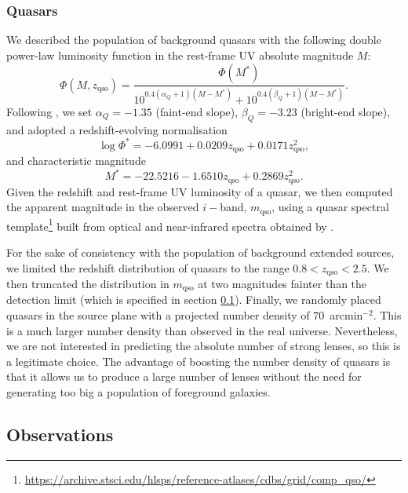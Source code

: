 \documentclass{aa}
\def\zqso{z_{\mathrm{qso}}}
\def\mqso{m_{\mathrm{qso}}}
\begin{document}
\subsubsection{Quasars}\label{ssub:quasars}

We described the population of background quasars with the following double power-law luminosity function in the rest-frame UV absolute magnitude $M$:
\begin{equation}
\Phi(M,\zqso) = \dfrac{\Phi(M^*)}{10^{0.4(\alpha_Q+1)(M - M^*)} + 10^{0.4(\beta_Q+1)(M - M^*)}}.
\end{equation}
Following \citet{Man++17}, we set $\alpha_Q=-1.35$ (faint-end slope), $\beta_Q=-3.23$ (bright-end slope), and adopted a redshift-evolving normalisation
\begin{equation}
\log{\Phi^*} = -6.0991 + 0.0209\zqso + 0.0171\zqso^2,
\end{equation}
and characteristic magnitude
\begin{equation}
M^* = -22.5216 - 1.6510\zqso + 0.2869\zqso^2.
\end{equation}
Given the redshift and rest-frame UV luminosity of a quasar, we then computed the apparent magnitude in the observed $i-$band, $\mqso$, using a quasar spectral template\footnote{\url{https://archive.stsci.edu/hlsps/reference-atlases/cdbs/grid/comp_qso/}} built from optical and near-infrared spectra obtained by \citet{vdB++01,Gli++06}.

For the sake of consistency with the population of background extended sources, we limited the redshift distribution of quasars to the range $0.8 < \zqso < 2.5$.
We then truncated the distribution in $\mqso$ at two magnitudes fainter than the detection limit (which is specified in section \ref{ssec:obs}).
Finally, we randomly placed quasars in the source plane with a projected number density of $70$~arcmin$^{-2}$. This is a much larger number density than observed in the real universe. Nevertheless, we are not interested in predicting the absolute number of strong lenses, so this is a legitimate choice. The advantage of boosting the number density of quasars is that it allows us to produce a large number of lenses without the need for generating too big a population of foreground galaxies.


\subsection{Observations}\label{ssec:obs}
\end{document}
